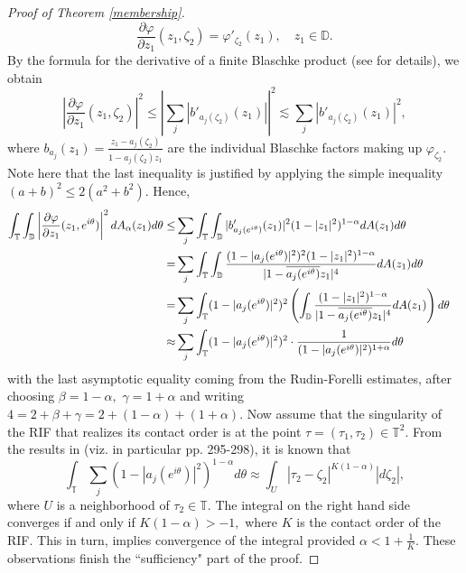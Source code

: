\documentclass[11pt]{amsart}
\numberwithin{equation}{section}
\begin{document}
\begin{proof}[Proof of Theorem \ref{membership}]
$$\frac{\partial \varphi}{\partial z_1}(z_1,\zeta_2)=\varphi'_{\zeta_2}(z_1), \quad z_1\in\mathbb{D}.$$
By the formula for the derivative of a finite Blaschke product (see \cite[Lemma 4.2]{PLMS} for details), we obtain $$\left|\frac{\partial \varphi}{\partial z_1}(z_1,\zeta_2)\right|^2\leq \left|\sum_{j}|b'_{a_j(\zeta_2)}(z_1)|\right|^2\lesssim\sum_{j}|b'_{a_j(\zeta_2)}(z_1)|^2,$$
where $b_{a_j}(z_1)=\frac{z_1-a_j(\zeta_2)}{1-\overline{a_j(\zeta_2)}z_1}$ are the individual Blaschke factors making up $\varphi_{\zeta_2}$.
Note here that the last inequality is justified by applying the simple inequality $(a+b)^2\leq 2(a^2+b^2).$
Hence,
\begin{align}
\int_{\mathbb{T}}\int_{\mathbb{D}}\left|\frac{\partial \varphi}{\partial z_1}(z_1,e^{i\theta})\right|^2dA_{\alpha}(z_1)d\theta\leq& \sum_{j}\int_{\mathbb{T}}\int_\mathbb{D}|b'_{a_j(e^{i\theta})}(z_1)|^2(1-|z_1|^2)^{1-\alpha}dA(z_1)d\theta  &&\\
=&\sum_{j}\int_{\mathbb{T}}\int_{\mathbb{D}}\frac{(1-|a_j(e^{i\theta})|^2)^2(1-|z_1|^2)^{1-\alpha}}{|1-\overline{a_j(e^{i\theta})}z_1|^4} dA(z_1)d\theta \notag \\
=&\sum_{j}\int_{\mathbb{T}}(1-|a_j(e^{i\theta})|^2)^2\left(\int_{\mathbb{D}}\frac{(1-|z_1|^2)^{1-\alpha}}{|1-\overline{a_{j}(e^{i\theta})}z_1|^4}dA(z_1)\right)d\theta \notag \\
\approx&\sum_{j}\int_{\mathbb{T}}(1-|a_{j}(e^{i\theta})|^2)^{2}\cdot \frac{1}{(1-|a_j(e^{i\theta})|^2)^{1+\alpha}}d\theta  \notag 
\end{align}
with the last asymptotic equality coming from the Rudin-Forelli estimates, after choosing $\beta=1-\alpha,$ $\gamma=1+\alpha$ and writing $4=2+\beta+\gamma=2+(1-\alpha)+(1+\alpha).$ Now assume that the singularity of the RIF that realizes its contact order is at the point $\tau=(\tau_1,\tau_2)\in \mathbb{T}^2.$
From the results in \cite{PLMS} (viz. in particular pp. 295-298), it is known that 
$$\int_{\mathbb{T}}\sum_{j}(1-|a_{j}(e^{i\theta})|^2)^{1-\alpha}d\theta\approx\int_{U}|\tau_2-\zeta_2|^{K(1-\alpha)}|d\zeta_2|,$$
where $U$ is a neighborhood of $\tau_2\in\mathbb{T}.$
The integral on the right hand side converges if and only if $K(1-\alpha)>-1,$ where $K$ is the contact order of the RIF. This in turn, implies convergence of the integral provided $\alpha<1+\frac{1}{K}.$ These observations finish the ``sufficiency" part of the proof. 


\end{proof}
\end{document}
